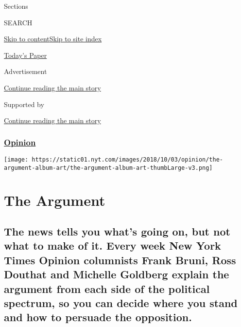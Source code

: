 Sections

SEARCH

\protect\hyperlink{site-content}{Skip to
content}\protect\hyperlink{site-index}{Skip to site index}

\href{https://myaccount.nytimes.com/auth/login?response_type=cookie\&client_id=vi}{}

\href{https://www.nytimes.com/section/todayspaper}{Today's Paper}

Advertisement

\protect\hyperlink{after-top}{Continue reading the main story}

Supported by

\protect\hyperlink{after-sponsor}{Continue reading the main story}

\hypertarget{opinion}{%
\subsubsection{\texorpdfstring{\href{/section/opinion}{Opinion}}{Opinion}}\label{opinion}}

\texttt{[image: https://static01.nyt.com/images/2018/10/03/opinion/the-argument-album-art/the-argument-album-art-thumbLarge-v3.png]}

\hypertarget{the-argument}{%
\section{The Argument}\label{the-argument}}

\hypertarget{the-news-tells-you-whats-going-on-but-not-what-to-make-of-it-every-week-new-york-times-opinion-columnists-frank-bruni-ross-douthat-and-michelle-goldberg-explain-the-argument-from-each-side-of-the-political-spectrum-so-you-can-decide-where-you-stand-and-how-to-persuade-the-opposition}{%
\subsection{The news tells you what's going on, but not what to make of
it. Every week New York Times Opinion columnists Frank Bruni, Ross
Douthat and Michelle Goldberg explain the argument from each side of the
political spectrum, so you can decide where you stand and how to
persuade the
opposition.}\label{the-news-tells-you-whats-going-on-but-not-what-to-make-of-it-every-week-new-york-times-opinion-columnists-frank-bruni-ross-douthat-and-michelle-goldberg-explain-the-argument-from-each-side-of-the-political-spectrum-so-you-can-decide-where-you-stand-and-how-to-persuade-the-opposition}}

